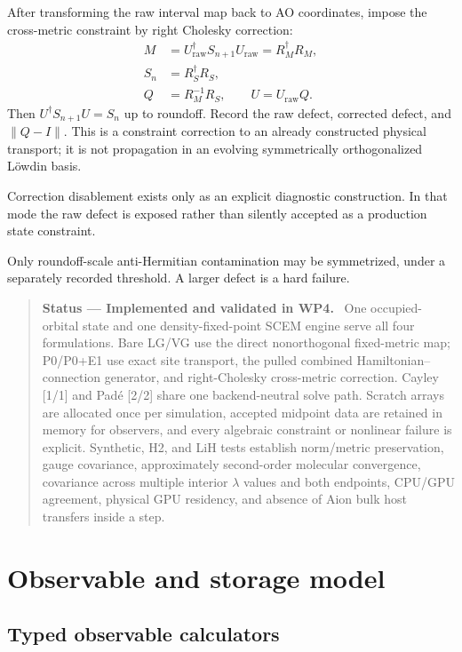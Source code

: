 \documentclass[11pt]{article}
\newcommand{\norm}[1]{\left\lVert#1\right\rVert}
\newenvironment{statusbox}[1]
  {\begin{quote}\small\textbf{Status --- #1.}\ }
  {\end{quote}}
\begin{document}
After transforming the raw interval map back to AO coordinates, impose the
cross-metric constraint by right Cholesky correction:
\begin{align}
 M&=U_{\mathrm{raw}}^\dagger S_{n+1}U_{\mathrm{raw}}
   =R_M^\dagger R_M,\nonumber\\
 S_n&=R_S^\dagger R_S,\nonumber\\
 Q&=R_M^{-1}R_S,\qquad
 U=U_{\mathrm{raw}}Q.
 \label{eq:cholesky-correction}
\end{align}
Then \(U^\dagger S_{n+1}U=S_n\) up to roundoff. Record the raw defect,
corrected defect, and \(\norm{Q-I}\). This is a constraint correction to an
already constructed physical transport; it is not propagation in an evolving
symmetrically orthogonalized L\"owdin basis.

Correction disablement exists only as an explicit diagnostic construction.
In that mode the raw defect is exposed rather than silently accepted as a
production state constraint.

Only roundoff-scale anti-Hermitian contamination may be symmetrized, under a
separately recorded threshold. A larger defect is a hard failure.

\begin{statusbox}{Implemented and validated in WP4}
One occupied-orbital state and one density-fixed-point SCEM engine serve all
four formulations. Bare LG/VG use the direct nonorthogonal fixed-metric map;
P0/P0+E1 use exact site transport, the pulled combined Hamiltonian--connection
generator, and right-Cholesky cross-metric correction. Cayley [1/1] and Pad\'e
[2/2] share one backend-neutral solve path. Scratch arrays are allocated once
per simulation, accepted midpoint data are retained in memory for observers,
and every algebraic constraint or nonlinear failure is explicit. Synthetic,
H2, and LiH tests establish norm/metric preservation, gauge covariance,
approximately second-order molecular convergence, covariance across multiple
interior \(\lambda\) values and both endpoints, CPU/GPU agreement, physical GPU
residency, and absence of Aion bulk host transfers inside a step.
\end{statusbox}

\section{Observable and storage model}

\subsection{Typed observable calculators}
\end{document}
